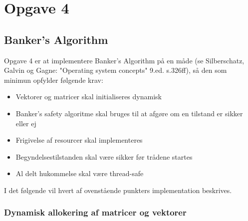 \section{Opgave 4}
\subsection{Banker's Algorithm}
Opgave 4 er at implementere Banker's Algorithm på en måde (se Silberschatz, Galvin og Gagne: "Operating system concepts" 9.ed. s.326ff), så den som minimun opfylder følgende krav:
\begin{itemize}
	\item Vektorer og matricer skal initialiseres dynamisk
	\item Banker's safety algoritme skal bruges til at afgøre om en tilstand er sikker eller ej
	\item Frigivelse af resourcer skal implementeres
	\item Begyndelsestilstanden skal være sikker før trådene startes
	\item Al delt hukommelse skal være thread-safe
\end{itemize}
I det følgende vil hvert af ovenstående punkters implementation beskrives.

\subsubsection*{Dynamisk allokering af matricer og vektorer}


